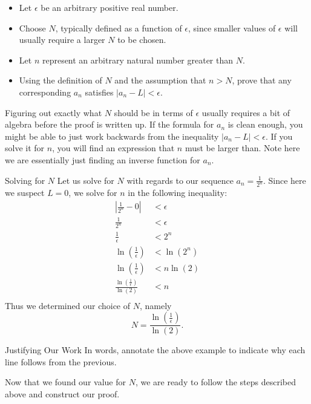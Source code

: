 \begin{itemize}
\item Let $\epsilon$ be an arbitrary positive real number.  
\item Choose $N$, typically defined as a function of $\epsilon$, since smaller values of $\epsilon$ will usually require a larger $N$ to be chosen. 
\item Let $n$ represent an arbitrary natural number greater than $N$.  
\item Using the definition of $N$ and the assumption that $n>N$, prove that any corresponding $a_n$ satisfies $\left|a_n-L\right|<\epsilon.$
\end{itemize}

Figuring out exactly what $N$ should be in terms of $\epsilon$ usually requires a bit of algebra before the proof is written up.  If the formula for $a_n$ is clean enough, you might be able to just work backwards from the inequality $\left| a_n-L \right|<\epsilon$.  If you solve it for $n$, you will find an expression that $n$ must be larger than.  Note here we are essentially just finding an inverse function for $a_n$.

\begin{example}{Solving for $N$}
Let us solve for $N$ with regards to our sequence $a_n=\frac{1}{2^n}$.  Since here we suspect $L=0$, we solve for $n$ in the following inequality: \begin{align*}
 \left| \frac{1}{2^n}-0 \right|&<\epsilon \\
  \frac{1}{2^n}&<\epsilon \\
  \frac{1}{\epsilon}&<2^n \\
  \ln\left(\frac{1}{\epsilon}\right)&<\ln\left(2^n\right) \\
  \ln\left(\frac{1}{\epsilon}\right)&<n\ln\left(2\right) \\
  \frac{\ln\left(\frac{1}{\epsilon}\right)}{\ln\left(2\right)}&<n \\
\end{align*}
Thus we determined our choice of $N$, namely $$N= \frac{\ln\left(\frac{1}{\epsilon}\right)}{\ln\left(2\right)}.$$
\end{example}

\begin{exercise}{Justifying Our Work \Coffeecup}
In words, annotate the above example to indicate why each line follows from the previous.
\end{exercise}

Now that we found our value for $N$, we are ready to follow the steps described above and construct our proof.

